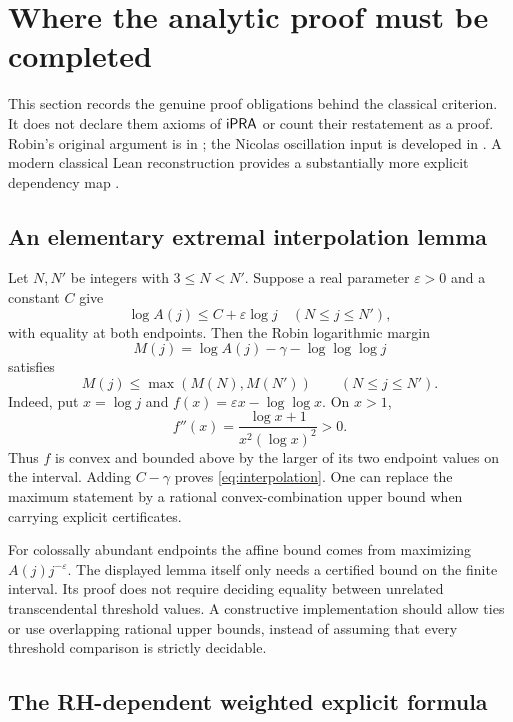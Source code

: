 \section{Where the analytic proof must be completed}
\label{sec:analytic}

This section records the genuine proof obligations behind the classical
criterion. It does not declare them axioms of $\mathsf{iPRA}$ or count their
restatement as a proof. Robin's original argument is in
\cite[\S\S3--4]{Robin}; the Nicolas oscillation input is developed in
\cite{Nicolas1983,Nicolas2012}. A modern classical Lean reconstruction
provides a substantially more explicit dependency map \cite{Whidden}.

\subsection{An elementary extremal interpolation lemma}

Let $N,N'$ be integers with $3\le N<N'$. Suppose a real parameter
$\varepsilon>0$ and a constant $C$ give
\[
 \log A(j)\le C+\varepsilon\log j
       \quad(N\le j\le N'),
\]
with equality at both endpoints. Then the Robin logarithmic margin
\[
 M(j)=\log A(j)-\gamma-\log\log\log j
\]
satisfies
\begin{equation}\label{eq:interpolation}
 M(j)\le \max(M(N),M(N'))\qquad(N\le j\le N').
\end{equation}
Indeed, put $x=\log j$ and $f(x)=\varepsilon x-\log\log x$.
On $x>1$,
\[
 f''(x)=\frac{\log x+1}{x^2(\log x)^2}>0.
\]
Thus $f$ is convex and bounded above by the larger of its two endpoint
values on the interval. Adding $C-\gamma$ proves
\eqref{eq:interpolation}. One can replace the maximum statement by a
rational convex-combination upper bound when carrying explicit
certificates.

For colossally abundant endpoints the affine bound comes from maximizing
$A(j)j^{-\varepsilon}$. The displayed lemma itself only needs a
certified bound on the finite interval. Its proof does not require
deciding equality between unrelated transcendental threshold values.
A constructive implementation should allow ties or use overlapping
rational upper bounds, instead of assuming that every threshold
comparison is strictly decidable.

\subsection{The RH-dependent weighted explicit formula}

